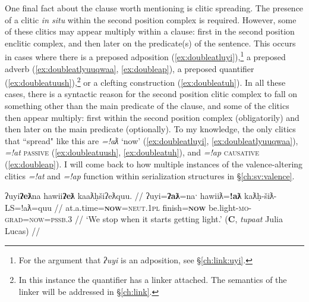 One final fact about the clause worth mentioning is clitic spreading. The presence of a clitic \textit{in situ} within the second position complex is required. However, some of these clitics may appear multiply within a clause: first in the second position enclitic complex, and then later on the predicate(s) of the sentence. This occurs in cases where there is a preposed adposition (\ref{ex:doubleatluyi}),\footnote{For the argument that \textit{ʔuyi} is an adposition, see \S\ref{ch:link:uyi}.} a preposed adverb (\ref{ex:doubleatlyuuqwaa}, \ref{ex:doubleap}), a preposed quantifier (\ref{ex:doubleatuush}),\footnote{In this instance the quantifier has a linker attached. The semantics of the linker will be addressed in \S\ref{ch:link}.} or a clefting construction (\ref{ex:doubleatuh}). In all these cases, there is a syntactic reason for the second position clitic complex to fall on something other than the main predicate of the clause, and some of the clitics then appear multiply: first within the second position complex (obligatorily) and then later on the main predicate (optionally). To my knowledge, the only clitics that ``spread" like this are \textit{=!aƛ} `now' (\ref{ex:doubleatluyi}, \ref{ex:doubleatlyuuqwaa}), \textit{=!at} \textsc{passive} (\ref{ex:doubleatuush}, \ref{ex:doubleatuh}), and \textit{=!ap} \textsc{causative} (\ref{ex:doubleap}). I will come back to how multiple instances of the valence-altering clitics \textit{=!at} and \textit{=!ap} function within serialization structures in \S\ref{ch:sv:valence}. %

\ex \label{ex:doubleatluyi}
\begingl
\glpreamble ʔuyi\textbf{ʔeƛ}na hawii\textbf{ʔeƛ} kaaƛḥšiʔeƛquu. //
\gla ʔuyi=\textbf{ʔaƛ}=naˑ hawiiƛ=\textbf{!aƛ} kaƛḥ-šiƛ-LS=!aƛ=quu  //
\glb at.a.time=\textbf{\textsc{now}}=\textsc{neut.1pl} finish=\textbf{\textsc{now}} be.light-\textsc{mo}-\textsc{grad}=\textsc{now}=\textsc{pssb.3} //
\glft `We stop when it starts getting light.' (\textbf{C}, \textit{tupaat} Julia Lucas) //
\endgl
\xe


